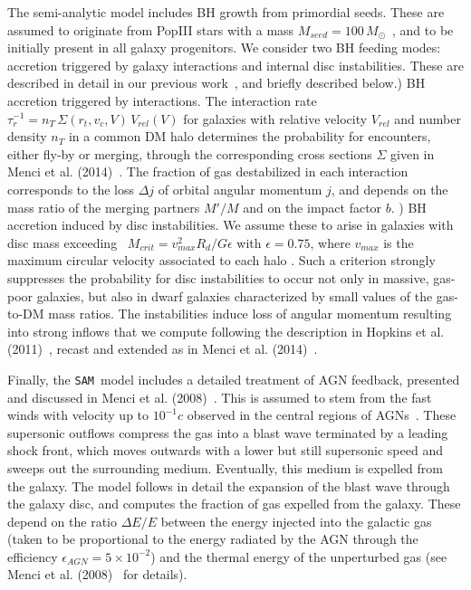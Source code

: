 \documentclass{natureprintstyle}
\newcommand{\sam}{\texttt{SAM}}
\begin{document}
The semi-analytic model includes BH growth from primordial seeds. These are assumed to originate from PopIII stars with a mass $M_{seed}=100\,M_{\odot}$~\cite{Madau2001}, and to be initially present in all galaxy progenitors. We consider two BH feeding modes: accretion triggered by galaxy interactions and internal disc instabilities. These are described in detail in our previous work~\cite{Menci2016}, and briefly described below.) BH accretion triggered by interactions. The interaction rate $\tau_r^{-1}=n_T\,\Sigma (r_t,v_c,V)\,V_{rel} (V)$ for galaxies with relative velocity $V_{rel}$ and number density $n_T$ in a common DM halo determines the probability for encounters, 
either fly-by or  merging, through the corresponding cross sections $\Sigma$ given in Menci et al. (2014)~\cite{Menci2014}. The fraction of
gas destabilized in each interaction corresponds to the loss $\Delta j$ of orbital angular momentum $j$, and depends on the mass ratio of the merging partners $M'/M$ and on the impact factor $b$. ) BH accretion induced by disc instabilities. We assume these to arise  in  galaxies with disc mass exceeding~\cite{Efstathiou1982} $M_{crit} =  {v_{max}^2 R_{d}/ G \epsilon}$ with $\epsilon=0.75$, where $v_{max}$ is the maximum circular velocity associated to each halo \cite{Mo1998}. 
Such a criterion strongly suppresses the probability for disc instabilities to occur not only in massive, gas-poor galaxies, but also in 
dwarf galaxies characterized by small values of the gas-to-DM mass ratios.
The instabilities induce loss of angular momentum resulting into strong inflows that we compute following the 
description in Hopkins et al. (2011)~\cite{Hopkins2011}, recast and extended as in Menci et al. (2014)~\cite{Menci2014}. 

Finally, the \sam\ model includes a detailed treatment of AGN feedback, presented and discussed in Menci et al. (2008)~\cite{Menci2008}.
This is assumed to stem from the fast winds with velocity up to
$10^{-1}c$ observed in the central regions of AGNs~\cite{Chartas2002, Pounds2003}.  
These supersonic outflows compress the gas into a blast wave terminated by
a leading shock front, which  moves outwards with a lower but still
supersonic speed and sweeps out the surrounding medium. Eventually,
this medium is expelled from the galaxy. The model follows in detail the expansion of the 
blast wave through the galaxy disc, and computes the fraction of gas expelled from the galaxy.  
These depend on the ratio $\Delta E/E$ between the  energy injected into the galactic gas 
(taken to be proportional to the energy radiated by the 
AGN through the efficiency $\epsilon_{AGN}=5\times 10^{-2}$)
and the thermal energy of the unperturbed gas (see Menci et al. (2008)~\cite{Menci2008} for details). 
\end{document}
